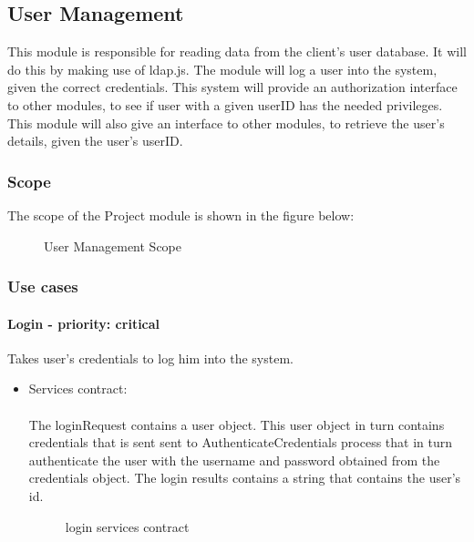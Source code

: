 \subsection{User Management}
This module is responsible for reading data from the client's user database. It will do this by making use of ldap.js. The module will log a user into the system, given the correct credentials. This system will provide an authorization interface to other modules, to see if user with a given userID has the needed privileges. This module will also give an interface to other modules, to retrieve the user's details, given the user's userID. 

\subsubsection{Scope}
The scope of the Project module is shown in the figure below:
	\begin{figure}[H]
	    	\centering
	    	\caption{User Management Scope}
	    	\label{fig:UserManagementScope}
   	\end{figure}
\subsubsection{Use cases}

\paragraph{Login - priority: critical}
Takes user's credentials to log him into the system.

\begin{itemize}
	\item Services contract:\\ \\
	The loginRequest contains a user object. This user object in turn contains credentials that is sent sent to AuthenticateCredentials process that in turn authenticate the user with the username and password obtained from the credentials object. The login results contains a string that contains the user's id.
	\begin{figure}[H]
    	\centering
    	\caption{login services contract}
    	\label{fig:login_services_contract}
   	\end{figure}
\end{itemize}

